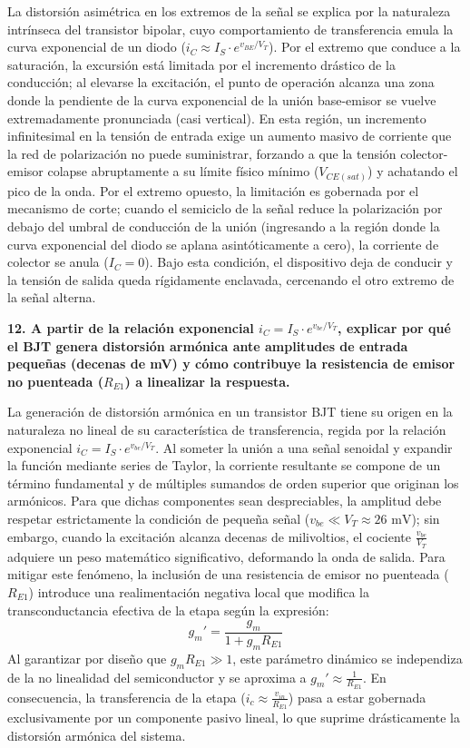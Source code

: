 La distorsión asimétrica en los extremos de la señal se explica por la naturaleza intrínseca del transistor bipolar, cuyo comportamiento de transferencia emula la curva exponencial de un diodo ($i_C \approx I_S \cdot e^{v_{BE}/V_T}$). Por el extremo que conduce a la saturación, la excursión está limitada por el incremento drástico de la conducción; al elevarse la excitación, el punto de operación alcanza una zona donde la pendiente de la curva exponencial de la unión base-emisor se vuelve extremadamente pronunciada (casi vertical). En esta región, un incremento infinitesimal en la tensión de entrada exige un aumento masivo de corriente que la red de polarización no puede suministrar, forzando a que la tensión colector-emisor colapse abruptamente a su límite físico mínimo ($V_{CE(sat)}$) y achatando el pico de la onda. Por el extremo opuesto, la limitación es gobernada por el mecanismo de corte; cuando el semiciclo de la señal reduce la polarización por debajo del umbral de conducción de la unión (ingresando a la región donde la curva exponencial del diodo se aplana asintóticamente a cero), la corriente de colector se anula ($I_C = 0$). Bajo esta condición, el dispositivo deja de conducir y la tensión de salida queda rígidamente enclavada, cercenando el otro extremo de la señal alterna.



\textbf{12. A partir de la relación exponencial $i_C = I_S \cdot e^{v_{be}/V_T}$, explicar por qué el BJT genera distorsión armónica ante amplitudes de entrada pequeñas (decenas de mV) y cómo contribuye la resistencia de emisor no puenteada ($R_{E1}$) a linealizar la respuesta.}

La generación de distorsión armónica en un transistor BJT tiene su origen en la naturaleza no lineal de su característica de transferencia, regida por la relación exponencial $i_C = I_S \cdot e^{v_{be}/V_T}$. Al someter la unión a una señal senoidal y expandir la función mediante series de Taylor, la corriente resultante se compone de un término fundamental y de múltiples sumandos de orden superior que originan los armónicos. Para que dichas componentes sean despreciables, la amplitud debe respetar estrictamente la condición de pequeña señal ($v_{be} \ll V_T \approx 26\text{ mV}$); sin embargo, cuando la excitación alcanza decenas de milivoltios, el cociente $\frac{v_{be}}{V_T}$ adquiere un peso matemático significativo, deformando la onda de salida. Para mitigar este fenómeno, la inclusión de una resistencia de emisor no puenteada ($R_{E1}$) introduce una realimentación negativa local que modifica la transconductancia efectiva de la etapa según la expresión:
$$g_m' = \frac{g_m}{1 + g_m R_{E1}}$$
Al garantizar por diseño que $g_m R_{E1} \gg 1$, este parámetro dinámico se independiza de la no linealidad del semiconductor y se aproxima a $g_m' \approx \frac{1}{R_{E1}}$. En consecuencia, la transferencia de la etapa ($i_c \approx \frac{v_{in}}{R_{E1}}$) pasa a estar gobernada exclusivamente por un componente pasivo lineal, lo que suprime drásticamente la distorsión armónica del sistema.

